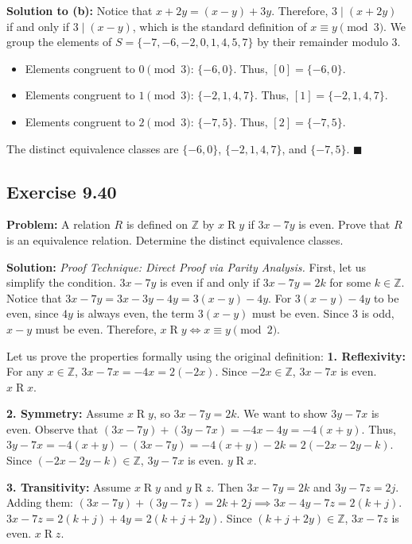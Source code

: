 \documentclass[11pt, a4paper]{article}
\theoremstyle{definition}
\theoremstyle{remark}
\newcommand{\Z}{\mathbb{Z}}
\begin{document}
\textbf{Solution to (b):}
Notice that $x + 2y = (x - y) + 3y$. Therefore, $3 \mid (x + 2y)$ if and only if $3 \mid (x - y)$, which is the standard definition of $x \equiv y \pmod 3$. We group the elements of $S = \{-7, -6, -2, 0, 1, 4, 5, 7\}$ by their remainder modulo 3.
\begin{itemize}
    \item Elements congruent to $0 \pmod 3$: $\{-6, 0\}$. Thus, $[0] = \{-6, 0\}$.
    \item Elements congruent to $1 \pmod 3$: $\{-2, 1, 4, 7\}$. Thus, $[1] = \{-2, 1, 4, 7\}$.
    \item Elements congruent to $2 \pmod 3$: $\{-7, 5\}$. Thus, $[2] = \{-7, 5\}$.
\end{itemize}
The distinct equivalence classes are $\{-6, 0\}$, $\{-2, 1, 4, 7\}$, and $\{-7, 5\}$.
$\blacksquare$

\subsection*{Exercise 9.40}
\textbf{Problem:} A relation $R$ is defined on $\Z$ by $x \mathrel{R} y$ if $3x - 7y$ is even. Prove that $R$ is an equivalence relation. Determine the distinct equivalence classes.

\textbf{Solution:}
\textit{Proof Technique: Direct Proof via Parity Analysis.}
First, let us simplify the condition. $3x - 7y$ is even if and only if $3x - 7y = 2k$ for some $k \in \Z$. 
Notice that $3x - 7y = 3x - 3y - 4y = 3(x - y) - 4y$. 
For $3(x - y) - 4y$ to be even, since $4y$ is always even, the term $3(x - y)$ must be even. Since 3 is odd, $x - y$ must be even. Therefore, $x \mathrel{R} y \iff x \equiv y \pmod 2$.

Let us prove the properties formally using the original definition:
\textbf{1. Reflexivity:} For any $x \in \Z$, $3x - 7x = -4x = 2(-2x)$. Since $-2x \in \Z$, $3x - 7x$ is even. $x \mathrel{R} x$.

\textbf{2. Symmetry:} Assume $x \mathrel{R} y$, so $3x - 7y = 2k$. We want to show $3y - 7x$ is even.
Observe that $(3x - 7y) + (3y - 7x) = -4x - 4y = -4(x + y)$.
Thus, $3y - 7x = -4(x + y) - (3x - 7y) = -4(x + y) - 2k = 2(-2x - 2y - k)$.
Since $(-2x - 2y - k) \in \Z$, $3y - 7x$ is even. $y \mathrel{R} x$.

\textbf{3. Transitivity:} Assume $x \mathrel{R} y$ and $y \mathrel{R} z$. Then $3x - 7y = 2k$ and $3y - 7z = 2j$.
Adding them: $(3x - 7y) + (3y - 7z) = 2k + 2j \implies 3x - 4y - 7z = 2(k + j)$.
$3x - 7z = 2(k + j) + 4y = 2(k + j + 2y)$.
Since $(k + j + 2y) \in \Z$, $3x - 7z$ is even. $x \mathrel{R} z$.
\end{document}
